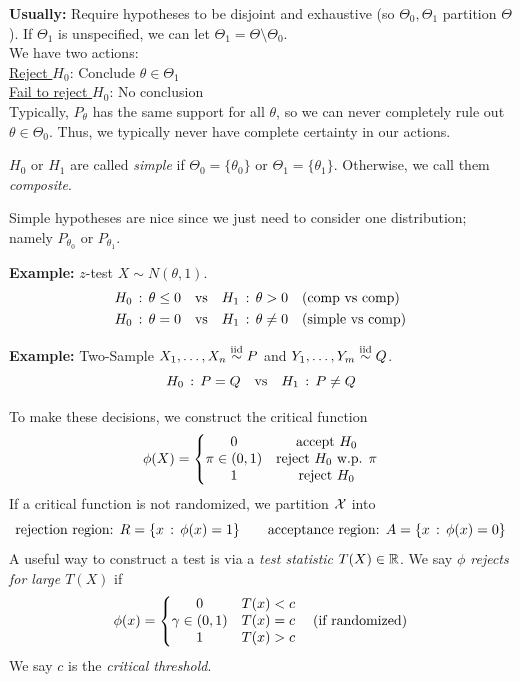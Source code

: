 \textbf{Usually:} Require hypotheses to be disjoint and exhaustive (so $\Theta_0, \Theta_1$ partition $\Theta$). If $\Theta_1$ is unspecified, we can let $\Theta_1 = \Theta \setminus \Theta_0$.\\

We have two actions:\\
\indent \underline{Reject $H_0$}: Conclude $\theta \in \Theta_1$\\
\indent \underline{Fail to reject $H_0$}: No conclusion\\


Typically, $P_{\theta}$ has the same support for all $\theta$, so we can never completely rule out $\theta \in \Theta_0$. Thus, we typically never have complete certainty in our actions.

\begin{definition}
    $H_0$ or $H_1$ are called \emph{simple} if $\Theta_0 = \{\theta_0\}$ or $\Theta_1 = \{\theta_1\}$. Otherwise, we call them \emph{composite}.
\end{definition}

Simple hypotheses are nice since we just need to consider one distribution; namely $P_{\theta_0}$ or $P_{\theta_1}$.

\begin{example}{\textbf{Example:} $z$-test}
    $X \sim N(\theta, 1)$.
    \begin{align*}
        H_0 \col \theta \leq 0 \quad &\tt{vs} \quad H_1 \col \theta > 0 \quad (\tt{comp vs comp})\\
        H_0 \col \theta = 0 \quad &\tt{vs} \quad H_1 \col \theta \neq 0 \quad (\tt{simple vs comp})
    \end{align*}
\end{example}

\begin{example}{\textbf{Example:} Two-Sample}
    $X_1, \ldots, X_n \iidsim P$ and $Y_1, \ldots, Y_m \iidsim Q$.
    \[ H_0 \col P = Q \quad \tt{vs} \quad H_1 \col P \neq Q \]
\end{example}

To make these decisions, we construct the critical function
\[ \phi(X) = \left\{\begin{matrix} 0 & \tt{accept } H_0 \\ \pi \in (0, 1) & \tt{reject } H_0 \tt{ w.p. } \pi \\ 1 & \tt{reject } H_0 \end{matrix}\right. \]
If a critical function is not randomized, we partition $\cal{X}$ into
\[ \tt{rejection region: } R = \{x \col \phi(x) = 1\} \qquad \tt{acceptance region: } A = \{x \col \phi(x) = 0\} \]
A useful way to construct a test is via a \emph{test statistic} $T(X) \in \R$. We say \emph{$\phi$ rejects for large $T(X)$} if
\[ \phi(x) = \left\{\begin{matrix} 0 & T(x) < c \\ \gamma \in (0, 1) & T(x) = c \\ 1 & T(x) > c \end{matrix}\right. \quad (\tt{if randomized}) \]
We say $c$ is the \emph{critical threshold}.\\


